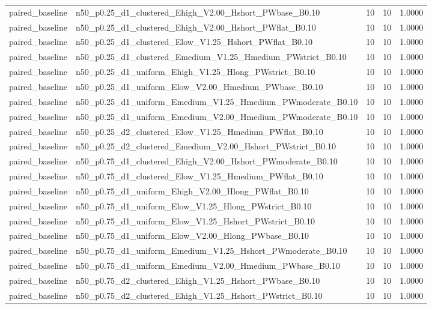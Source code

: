 \begin{tabular}{llrrr}
paired_baseline & n50_p0.25_d1_clustered_Ehigh_V2.00_Hshort_PWbase_B0.10 & 10 & 10 & 1.0000 \\
paired_baseline & n50_p0.25_d1_clustered_Ehigh_V2.00_Hshort_PWflat_B0.10 & 10 & 10 & 1.0000 \\
paired_baseline & n50_p0.25_d1_clustered_Elow_V1.25_Hshort_PWflat_B0.10 & 10 & 10 & 1.0000 \\
paired_baseline & n50_p0.25_d1_clustered_Emedium_V1.25_Hmedium_PWstrict_B0.10 & 10 & 10 & 1.0000 \\
paired_baseline & n50_p0.25_d1_uniform_Ehigh_V1.25_Hlong_PWstrict_B0.10 & 10 & 10 & 1.0000 \\
paired_baseline & n50_p0.25_d1_uniform_Elow_V2.00_Hmedium_PWbase_B0.10 & 10 & 10 & 1.0000 \\
paired_baseline & n50_p0.25_d1_uniform_Emedium_V1.25_Hmedium_PWmoderate_B0.10 & 10 & 10 & 1.0000 \\
paired_baseline & n50_p0.25_d1_uniform_Emedium_V2.00_Hmedium_PWmoderate_B0.10 & 10 & 10 & 1.0000 \\
paired_baseline & n50_p0.25_d2_clustered_Elow_V1.25_Hmedium_PWflat_B0.10 & 10 & 10 & 1.0000 \\
paired_baseline & n50_p0.25_d2_clustered_Emedium_V2.00_Hshort_PWstrict_B0.10 & 10 & 10 & 1.0000 \\
paired_baseline & n50_p0.75_d1_clustered_Ehigh_V2.00_Hshort_PWmoderate_B0.10 & 10 & 10 & 1.0000 \\
paired_baseline & n50_p0.75_d1_clustered_Elow_V1.25_Hmedium_PWflat_B0.10 & 10 & 10 & 1.0000 \\
paired_baseline & n50_p0.75_d1_uniform_Ehigh_V2.00_Hlong_PWflat_B0.10 & 10 & 10 & 1.0000 \\
paired_baseline & n50_p0.75_d1_uniform_Elow_V1.25_Hlong_PWstrict_B0.10 & 10 & 10 & 1.0000 \\
paired_baseline & n50_p0.75_d1_uniform_Elow_V1.25_Hshort_PWstrict_B0.10 & 10 & 10 & 1.0000 \\
paired_baseline & n50_p0.75_d1_uniform_Elow_V2.00_Hlong_PWbase_B0.10 & 10 & 10 & 1.0000 \\
paired_baseline & n50_p0.75_d1_uniform_Emedium_V1.25_Hshort_PWmoderate_B0.10 & 10 & 10 & 1.0000 \\
paired_baseline & n50_p0.75_d1_uniform_Emedium_V2.00_Hmedium_PWbase_B0.10 & 10 & 10 & 1.0000 \\
paired_baseline & n50_p0.75_d2_clustered_Ehigh_V1.25_Hshort_PWbase_B0.10 & 10 & 10 & 1.0000 \\
paired_baseline & n50_p0.75_d2_clustered_Ehigh_V1.25_Hshort_PWstrict_B0.10 & 10 & 10 & 1.0000 \\

\end{tabular}
